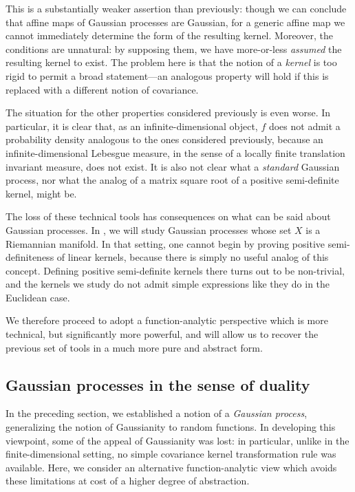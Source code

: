 \documentclass[11pt]{book}
\begin{document}
This is a substantially weaker assertion than previously: though we can conclude that affine maps of Gaussian processes are Gaussian, for a generic affine map we cannot immediately determine the form of the resulting kernel.
Moreover, the conditions are unnatural: by supposing them, we have more-or-less \emph{assumed} the resulting kernel to exist.
The problem here is that the notion of a \emph{kernel} is too rigid to permit a broad statement---an analogous property will hold if this is replaced with a different notion of covariance.

The situation for the other properties considered previously is even worse.
In particular, it is clear that, as an infinite-dimensional object, $f$ does not admit a probability density analogous to the ones considered previously, because an infinite-dimensional Lebesgue measure, in the sense of a locally finite translation invariant measure, does not exist.
It is also not clear what a \emph{standard} Gaussian process, nor what the analog of a matrix square root of a positive semi-definite kernel, might be.

The loss of these technical tools has consequences on what can be said about Gaussian processes.
In , we will study Gaussian processes whose set $X$ is a Riemannian manifold.
In that setting, one cannot begin by proving positive semi-definiteness of linear kernels, because there is simply no useful analog of this concept.
Defining positive semi-definite kernels there turns out to be non-trivial, and the kernels we study do not admit simple expressions like they do in the Euclidean case.

We therefore proceed to adopt a function-analytic perspective which is more technical, but significantly more powerful, and will allow us to recover the previous set of tools in a much more pure and abstract form.

\subsection{Gaussian processes in the sense of duality}
\label{sec:abstract-gp}

In the preceding section, we established a notion of a \emph{Gaussian process}, generalizing the notion of Gaussianity to random functions.
In developing this viewpoint, some of the appeal of Gaussianity was lost: in particular, unlike in the finite-dimensional setting, no simple covariance kernel transformation rule was available.
Here, we consider an alternative function-analytic view which avoids these limitations at cost of a higher degree of abstraction.
\end{document}
